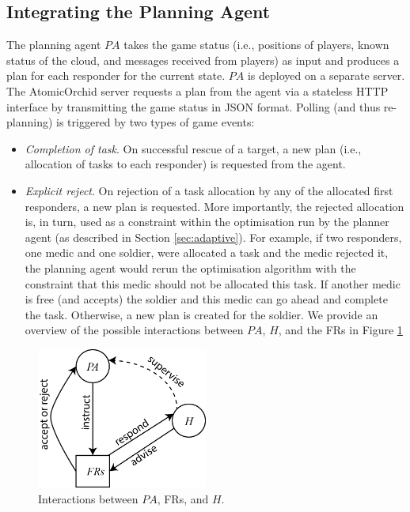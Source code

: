 \subsection{Integrating the Planning Agent}
\noindent The planning agent $PA$ takes the game status (i.e., positions of players, known status of the cloud, and messages received from players) as input and produces a plan for each responder  for the current state. $PA$ is deployed on a separate server. The AtomicOrchid server requests a plan from the agent via a stateless HTTP interface by transmitting the game status in JSON format. Polling (and thus re-planning) is triggered by two types of game events:
\begin{itemize}
\item \textit{Completion of task}. On successful rescue of a target, a new plan (i.e., allocation of tasks to each responder) is requested from the agent.
\item \textit{Explicit reject}. On rejection of a task allocation by any of the allocated first responders, a new plan is requested.  More importantly, the rejected allocation is, in turn, used as a constraint within the optimisation run by the planner agent (as described in Section \ref{sec:adaptive}). For example, if two responders, one medic and one soldier, were allocated a task and the medic rejected it, the planning agent would rerun the optimisation algorithm with the constraint that this medic should not be allocated this task. If another medic is free (and accepts) the soldier and this medic can go ahead and complete the task. Otherwise, a new plan is created for the soldier. We provide an overview of the possible interactions between $PA$, $H$, and the FRs in Figure \ref{fig:arch}
\end{itemize} 
\begin{figure}\centering
\includegraphics[width=0.5\textwidth]{agent-planner.png}
\caption{Interactions between $PA$, FRs, and $H$.}
\label{fig:arch}
\end{figure}

